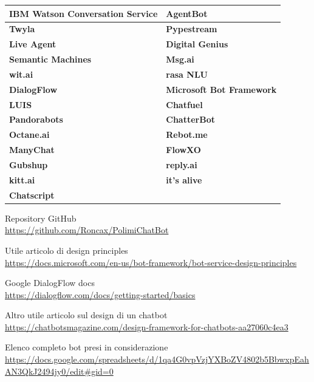 \documentclass[]{article}
\begin{document}
\begin{tabular}{lp{}}
\toprule
\textbf{IBM Watson Conversation Service} &  \hfill \textbf{AgentBot} \hfill \\
\midrule
\textbf{Twyla} & \hfill \textbf{Pypestream} \hfill \\
\midrule
\textbf{Live Agent} &  \hfill \textbf{Digital Genius} \hfill \\
\midrule
\textbf{Semantic Machines} &  \hfill \textbf{Msg.ai} \hfill \\
\midrule
\textbf{wit.ai} &  \hfill \textbf{rasa NLU} \hfill \\
\midrule
\textbf{DialogFlow} &  \hfill \textbf{Microsoft Bot Framework} \hfill \\
\midrule
\textbf{LUIS} &  \hfill \textbf{Chatfuel} \hfill \\
\midrule
\textbf{Pandorabots} &  \hfill \textbf{ChatterBot} \hfill \\
\midrule
\textbf{Octane.ai} &  \hfill \textbf{Rebot.me} \hfill \\
\midrule
\textbf{ManyChat} &  \hfill \textbf{FlowXO} \hfill \\
\midrule
\textbf{Gubshup} &  \hfill \textbf{reply.ai} \hfill \\
\midrule
\textbf{kitt.ai} &  \hfill \textbf{it's alive} \hfill \\
\midrule
\textbf{Chatscript} \\
\midrule
\bottomrule
\end{tabular}

\pagebreak
\begin{thebibliography}{9}
Repository GitHub \\ \url{https://github.com/Roncax/PolimiChatBot}
 
Utile articolo di design principles \\ \url{https://docs.microsoft.com/en-us/bot-framework/bot-service-design-principles}

Google DialogFlow docs\\ \url{https://dialogflow.com/docs/getting-started/basics}

Altro utile articolo sul design di un chatbot\\ \url{https://chatbotsmagazine.com/design-framework-for-chatbots-aa27060c4ea3}

Elenco completo bot presi in considerazione\\ \url{https://docs.google.com/spreadsheets/d/1qa4G0vpVzjYXBoZV4802b5BbwxpEahAN3QkJ2494jy0/edit#gid=0}

\end{thebibliography}
\end{document}
